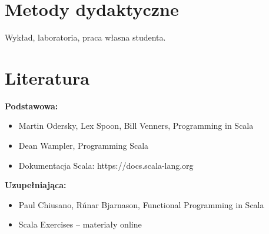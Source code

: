\documentclass[12pt, a4paper]{article}
\begin{document}
\section{Metody dydaktyczne}

Wykład, laboratoria, praca własna studenta.

\section{Literatura}

\textbf{Podstawowa:}
\begin{itemize}
  \item Martin Odersky, Lex Spoon, Bill Venners, Programming in Scala
  \item Dean Wampler, Programming Scala
  \item Dokumentacja Scala: https://docs.scala-lang.org
\end{itemize}

\textbf{Uzupełniająca:}
\begin{itemize}
  \item Paul Chiusano, Rúnar Bjarnason, Functional Programming in Scala
  \item Scala Exercises – materiały online
\end{itemize}
\end{document}
